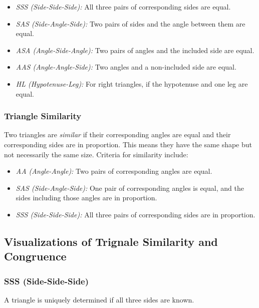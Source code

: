 \begin{itemize}[label=\(-\)]
    \item \emph{SSS (Side-Side-Side):} All three pairs of corresponding sides are equal.
    \item \emph{SAS (Side-Angle-Side):} Two pairs of sides and the angle between them are equal.
    \item \emph{ASA (Angle-Side-Angle):} Two pairs of angles and the included side are equal.
    \item \emph{AAS (Angle-Angle-Side):} Two angles and a non-included side are equal.
    \item \emph{HL (Hypotenuse-Leg):} For right triangles, if the hypotenuse and one leg are equal.
\end{itemize}

\subsubsection{Triangle Similarity}
Two triangles are \emph{similar} if their corresponding angles are equal and their corresponding sides are in proportion. This means they have the same shape but not necessarily the same size. Criteria for similarity include:

\begin{itemize}[label=\(-\)]
    \item \emph{AA (Angle-Angle):} Two pairs of corresponding angles are equal.
    \item \emph{SAS (Side-Angle-Side):} One pair of corresponding angles is equal, and the sides including those angles are in proportion.
    \item \emph{SSS (Side-Side-Side):} All three pairs of corresponding sides are in proportion.
\end{itemize}

\subsection{Visualizations of Trignale Similarity and Congruence}
\subsubsection{SSS (Side-Side-Side)}
A triangle is uniquely determined if all three sides are known.
\begin{center}
\end{center}

